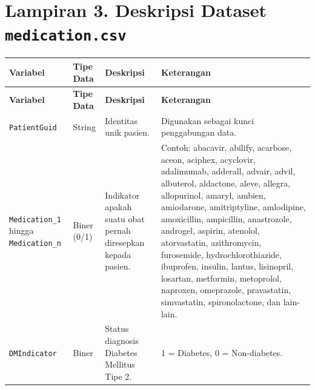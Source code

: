 \section*{Lampiran 3. Deskripsi Dataset \texttt{medication.csv}}
\label{app:medication}
\small
\begin{longtable}{|L{2.8cm}|C{1.8cm}|L{3.3cm}|L{5.2cm}|}
\hline
\textbf{Variabel} & \textbf{Tipe Data} & \textbf{Deskripsi} & \textbf{Keterangan}\\ \hline
\endfirsthead
\hline
\textbf{Variabel} & \textbf{Tipe Data} & \textbf{Deskripsi} & \textbf{Keterangan}\\ \hline
\endhead
\texttt{PatientGuid} & String & Identitas unik pasien. & Digunakan sebagai kunci penggabungan data.\\ \hline
\texttt{Medication\_1} hingga \texttt{Medication\_n} & Biner (0/1) & Indikator apakah suatu obat pernah diresepkan kepada pasien. & Contoh: abacavir, abilify, acarbose, aceon, aciphex, acyclovir, adalimumab, adderall, advair, advil, albuterol, aldactone, aleve, allegra, allopurinol, amaryl, ambien, amiodarone, amitriptyline, amlodipine, amoxicillin, ampicillin, anastrozole, androgel, aspirin, atenolol, atorvastatin, azithromycin, furosemide, hydrochlorothiazide, ibuprofen, insulin, lantus, lisinopril, losartan, metformin, metoprolol, naproxen, omeprazole, pravastatin, simvastatin, spironolactone, dan lain-lain.\\ \hline
\texttt{DMIndicator} & Biner & Status diagnosis Diabetes Mellitus Tipe 2. & 1 = Diabetes, 0 = Non-diabetes.\\ \hline
\end{longtable}
\normalsize

